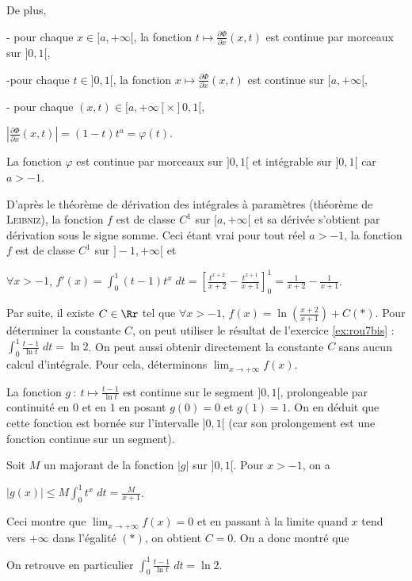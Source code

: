{{De plus,

- pour chaque $x\in[a,+\infty[$, la fonction $t\mapsto\frac{\partial \Phi}{\partial x}(x,t)$ est continue par morceaux sur $]0,1[$,

-pour chaque $t\in]0,1[$, la fonction $x\mapsto\frac{\partial \Phi}{\partial x}(x,t)$ est continue sur $[a,+\infty[$,

- pour chaque $(x,t)\in[a,+\infty[\times]0,1[$,

\begin{center}
$\left|\frac{\partial \Phi}{\partial x}(x,t)\right|=(1-t)t^a=\varphi(t)$.
\end{center}

La fonction $\varphi$ est continue par morceaux sur $]0,1[$ et intégrable sur $]0,1[$ car $a>-1$.

D'après le théorème de dérivation des intégrales à paramètres (théorème de \textsc{Leibniz}), la fonction $f$ est de classe $C^1$ sur $[a,+\infty[$ et sa dérivée s'obtient par dérivation sous le signe somme. Ceci étant vrai pour tout réel $a>-1$, la fonction $f$ est de classe $C^1$ sur $]-1,+\infty[$ et

\begin{center}
$\forall x>-1$, $f'(x)=\int_{0}^{1}(t-1)t^x\;dt=\left[\frac{t^{x+2}}{x+2}-\frac{t^{x+1}}{x+1}\right]_0^1=\frac{1}{x+2}-\frac{1}{x+1}$.
\end{center}

Par suite, il existe $C\in\Rr$ tel que $\forall x>-1$, $f(x)=\ln\left(\frac{x+2}{x+1}\right)+C$\quad$(*)$. Pour déterminer la constante $C$, on peut utiliser le résultat de l'exercice \ref{ex:rou7bis} : $\int_{0}^{1}\frac{t-1}{\ln t}\;dt=\ln2$. On peut aussi obtenir directement la constante $C$ sans aucun calcul d'intégrale. Pour cela, déterminons $\lim_{x \rightarrow +\infty}f(x)$.

La fonction $g~:~t\mapsto\frac{t-1}{\ln t}$ est continue sur le segment $]0,1[$, prolongeable par continuité en $0$ et en $1$ en posant $g(0)=0$ et $g(1)=1$. On en déduit que cette fonction est bornée sur l'intervalle $]0,1[$ (car son prolongement est une fonction continue sur un segment).

Soit $M$ un majorant de la fonction $|g|$ sur $]0,1[$. Pour $x>-1$, on a

\begin{center}
$|g(x)|\leqslant M\int_{0}^{1}t^x\;dt=\frac{M}{x+1}$.
\end{center}

Ceci montre que $\lim_{x \rightarrow +\infty}f(x)=0$ et en passant à la limite quand $x$ tend vers $+\infty$ dans l'égalité $(*)$, on obtient $C=0$. On a donc montré que

\begin{center}
\end{center}

On retrouve en particulier $\int_{0}^{1}\frac{t-1}{\ln t}\;dt=\ln2$.}
}